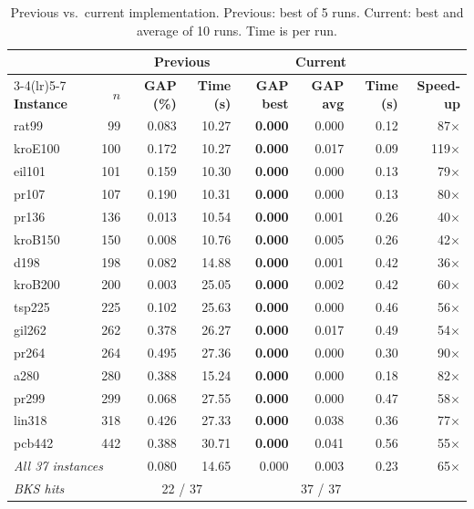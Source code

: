 \documentclass[runningheads]{llncs}
\begin{document}
\begin{table}
\caption{Previous vs.\ current implementation. Previous: best of 5
runs. Current: best and average of 10 runs. Time is per run.}
\label{tab:cmp}
\centering\scriptsize
\begin{tabular}{@{}lrrrrrrr@{}}
\toprule
& & \multicolumn{2}{c}{\textbf{Previous}} & \multicolumn{3}{c}{\textbf{Current}} & \\
\cmidrule(lr){3-4}\cmidrule(lr){5-7}
\textbf{Instance} & $n$ & \textbf{GAP (\%)} & \textbf{Time (s)} & \textbf{GAP best} & \textbf{GAP avg} & \textbf{Time (s)} & \textbf{Speed-up}\\
\midrule
rat99 & 99 & 0.083 & 10.27 & \textbf{0.000} & 0.000 & 0.12 & 87$\times$ \\
kroE100 & 100 & 0.172 & 10.27 & \textbf{0.000} & 0.017 & 0.09 & 119$\times$ \\
eil101 & 101 & 0.159 & 10.30 & \textbf{0.000} & 0.000 & 0.13 & 79$\times$ \\
pr107 & 107 & 0.190 & 10.31 & \textbf{0.000} & 0.000 & 0.13 & 80$\times$ \\
pr136 & 136 & 0.013 & 10.54 & \textbf{0.000} & 0.001 & 0.26 & 40$\times$ \\
kroB150 & 150 & 0.008 & 10.76 & \textbf{0.000} & 0.005 & 0.26 & 42$\times$ \\
d198 & 198 & 0.082 & 14.88 & \textbf{0.000} & 0.001 & 0.42 & 36$\times$ \\
kroB200 & 200 & 0.003 & 25.05 & \textbf{0.000} & 0.002 & 0.42 & 60$\times$ \\
tsp225 & 225 & 0.102 & 25.63 & \textbf{0.000} & 0.000 & 0.46 & 56$\times$ \\
gil262 & 262 & 0.378 & 26.27 & \textbf{0.000} & 0.017 & 0.49 & 54$\times$ \\
pr264 & 264 & 0.495 & 27.36 & \textbf{0.000} & 0.000 & 0.30 & 90$\times$ \\
a280 & 280 & 0.388 & 15.24 & \textbf{0.000} & 0.000 & 0.18 & 82$\times$ \\
pr299 & 299 & 0.068 & 27.55 & \textbf{0.000} & 0.000 & 0.47 & 58$\times$ \\
lin318 & 318 & 0.426 & 27.33 & \textbf{0.000} & 0.038 & 0.36 & 77$\times$ \\
pcb442 & 442 & 0.388 & 30.71 & \textbf{0.000} & 0.041 & 0.56 & 55$\times$ \\
\midrule
\multicolumn{2}{l}{\textit{All 37 instances}} & 0.080 & 14.65 & 0.000 & 0.003 & 0.23 & 65$\times$ \\
\multicolumn{2}{l}{\textit{BKS hits}} & \multicolumn{2}{c}{22 / 37} & \multicolumn{3}{c}{37 / 37} & \\
\bottomrule
\end{tabular}
\end{table}
\end{document}
